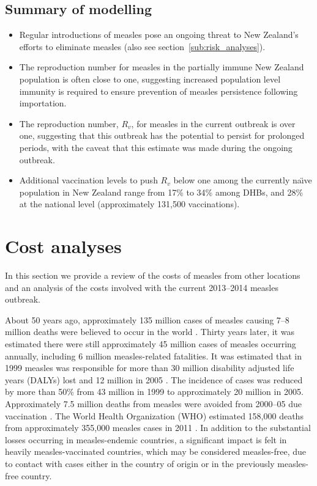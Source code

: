 \documentclass{article}
\begin{document}
\subsection{Summary of modelling}
\begin{itemize}
\item Regular introductions of measles pose an ongoing threat to New Zealand's efforts to eliminate measles (also see section~\autoref{sub:risk_analyses}).
\item The reproduction number for measles in the partially immune New Zealand population is often close to one, suggesting increased population level immunity is required to ensure prevention of measles persistence following importation.
 \item The reproduction number, $R_v$, for measles in the current outbreak is over one, suggesting that this outbreak has the potential to persist for prolonged periods, with the caveat that this estimate was made during the ongoing outbreak.
 \item Additional vaccination levels to push $R_v$ below one among the currently na\"{\i}ve population in New Zealand range from 17\% to 34\% among DHBs, and 28\% at the national level (approximately 131,500 vaccinations).
\end{itemize}

\section{Cost analyses}

In this section we provide a review of the costs of measles from other locations and an analysis of the costs involved with the current 2013--2014 measles outbreak.

About 50 years ago, approximately 135 million cases of measles causing 7--8 million deaths were believed to occur in the world \citep{clements4}. Thirty years later, it was estimated there were still approximately 45 million cases of measles occurring annually, including 6 million measles-related fatalities. It was estimated that in 1999 measles was responsible for more than 30 million disability adjusted life years (DALYs) lost and 12 million in 2005 \citep{wolfson7}. The incidence of cases was reduced by more than 50\% from 43 million in 1999 to approximately 20 million in 2005. Approximately 7.5 million deaths from measles were avoided from 2000--05 due vaccination \citep{wolfson7}. The World Health Organization (WHO) estimated 158,000 deaths from approximately 355,000 measles cases in 2011 \citep{who13}.  In addition to the substantial losses occurring in measles-endemic countries, a significant impact is felt in heavily measles-vaccinated countries, which may be considered measles-free, due to contact with cases either in the country of origin or in the previously measles-free country.
\end{document}
